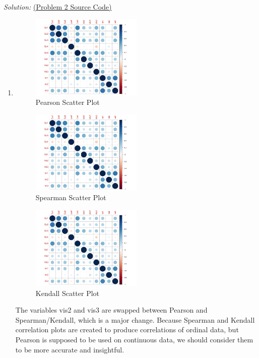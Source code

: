 \documentclass{article}
\newenvironment{solution}
    {\textit{Solution:}}
    {}
\begin{document}
\begin{solution}
\href{run:./src/p2.r}{ (Problem 2 Source Code)}
\begin{enumerate}
	\item\mbox{}
	\begin{figure}[h]
		\centering
		\includegraphics[width=0.5\textwidth]{Figure1_Pearson.jpeg}
		\caption{Pearson Scatter Plot}
	\end{figure}
	\begin{figure}[h]
		\centering
		\includegraphics[width=0.5\textwidth]{Figure1_Spearman.jpeg}
		\caption{Spearman Scatter Plot}
	\end{figure}
	\begin{figure}[h]
		\centering
		\includegraphics[width=0.5\textwidth]{Figure1_Kendall.jpeg}
		\caption{Kendall Scatter Plot}
	\end{figure}
\newpage
The variables vis2 and vis3 are swapped between Pearson and Spearman/Kendall, which is a major change. Because Spearman and Kendall correlation plots are created to produce correlations of ordinal data, but Pearson is supposed to be used on continuous data, we should consider them to be more accurate and insightful.

\end{enumerate}
\end{solution}
\end{document}
